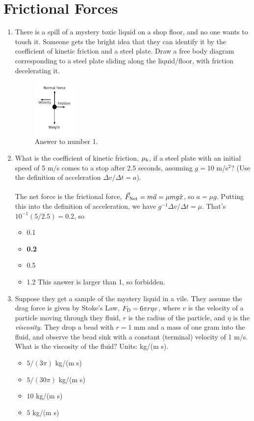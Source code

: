 \documentclass[10pt]{article}
\begin{document}
\section{Frictional Forces}
\begin{enumerate}
\item There is a spill of a mystery toxic liquid on a shop floor, and no one wants to touch it.  Someone gets the bright idea that they can identify it by the coefficient of kinetic friction and a steel plate.  Draw a free body diagram corresponding to a steel plate sliding along the liquid/floor, with friction decelerating it.\\
\begin{figure}[ht]
\centering
\includegraphics[width=0.2\textwidth]{figures/FBD3.pdf}
\caption{\label{fig:fbd3} Answer to number 1.}
\end{figure}
\item What is the coefficient of kinetic friction, $\mu_{\rm k}$, if a steel plate with an initial speed of 5 m/s comes to a stop after 2.5 seconds, assuming $g = 10$ m/s$^2$?  (Use the definition of acceleration $\Delta v/\Delta t = a$). \\ \\
The net force is the frictional force, $\vec{F}_{\rm Net} = m\vec{a} = \mu m g \hat{x}$, so $a = \mu g$.  Putting this into the definition of acceleration, we have $g^{-1} \Delta v/\Delta t = \mu$.  That's $10^{-1} (5/2.5) = 0.2$, so
\begin{itemize}
\item 0.1
\item \textbf{0.2}
\item 0.5
\item 1.2 This answer is larger than 1, so forbidden.
\end{itemize}
\item Suppose they get a sample of the mystery liquid in a vile.  They assume the drag force is given by Stoke's Law, $F_{\rm D} = 6\pi r \eta v$, where $v$ is the velocity of a particle moving through they fluid, $r$ is the radius of the particle, and $\eta$ is the \textit{viscosity}.  They drop a bead with $r = 1$ mm and a mass of one gram into the fluid, and observe the bead sink with a constant (terminal) velocity of 1 m/s.  What is the viscosity of the fluid?  Units: kg/(m s).
\begin{itemize}
\item $5/(3\pi)$ kg/(m s)
\item $5/(30\pi)$ kg/(m s)
\item $10$ kg/(m s)
\item $5$ kg/(m s)
\end{itemize}
\end{enumerate}
\end{document}
